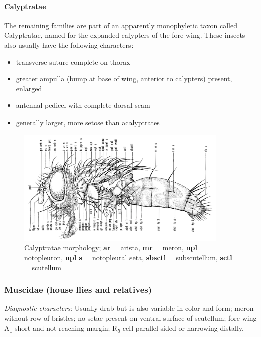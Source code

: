 \documentclass[letterpaper, 11pt]{article}
\begin{document}
\paragraph{Calyptratae} The remaining families are part of an apparently monophyletic taxon called Calyptratae, named for the expanded calypters of the fore wing. These insects also usually have the following characters:
\begin{itemize}
\item transverse suture complete on thorax
\item greater ampulla (bump at base of wing, anterior to calypters) present, enlarged 
\item antennal pedicel with complete dorsal seam
\item generally larger, more setose than acalyptrates
\end{itemize}

\begin{figure}[ht!]
  \centering
    \includegraphics[width=0.9\textwidth]{CalyptrateMorph}
  \caption{Calyptratae morphology; \textbf{ar} = arista, \textbf{mr} = meron, \textbf{npl} = notopleuron, \textbf{npl s} = notopleural seta, \textbf{sbsctl} = subscutellum, \textbf{sctl} = scutellum \citep[][Fig. 2.66]{mcalpine1981manual}}
  \label{fig:calyptratemorph}
\end{figure}

\subsubsection{Muscidae (house flies and relatives)}
\noindent{}\textit{Diagnostic characters:} Usually drab but is also variable in color and form; meron without row of bristles; no setae present on ventral surface of scutellum; fore wing \texorpdfstring{A\textsubscript{1}}{A1} short and not reaching margin; \texorpdfstring{R\textsubscript{5}}{R5} cell parallel-sided or narrowing distally.\\
\end{document}

